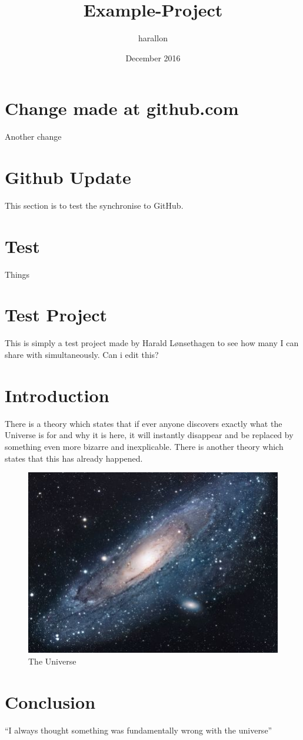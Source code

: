 \documentclass{article}
\title{Example-Project}
\author{harallon }
\date{December 2016}
\begin{document}
\maketitle

\section{Change made at github.com}
Another change

\section{Github Update}
This section is to test the synchronise to GitHub. 

\section{Test}
Things


\section{Test Project}
This is simply a test project made by Harald Lønsethagen to see how many I can share with simultaneously.
Can i edit this?

\section{Introduction}
There is a theory which states that if ever anyone discovers exactly what the Universe is for and why it is here, it will instantly disappear and be replaced by something even more bizarre and inexplicable.
There is another theory which states that this has already happened.

\begin{figure}[h!]
\centering
\includegraphics[scale=1.7]{universe.jpg}
\caption{The Universe}
\label{fig:univerise}
\end{figure}

\section{Conclusion}
``I always thought something was fundamentally wrong with the universe'' \citep{adams1995hitchhiker}



\end{document}
